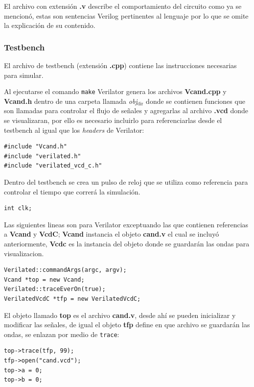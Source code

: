 \documentclass[11pt]{/home/hao/dev/org/latex-plantilla/IEEEtran}
\begin{document}
El archivo con extensión \textbf{.v} describe el comportamiento del
circuito como ya se mencionó, estas son sentencias Verilog
pertinentes al lenguaje por lo que se omite la explicación de su
contenido.

\subsubsection{Testbench}
\label{sec:org051699d}
El archivo de testbench (extensión \textbf{.cpp}) contiene las
instrucciones necesarias para simular.

Al ejecutarse el comando \texttt{make} Verilator genera los archivos
\textbf{Vcand.cpp} y \textbf{Vcand.h} dentro de una carpeta llamada \emph{obj\(_{\text{dir}}\)}
donde se contienen funciones que son llamadas para controlar el
flujo de señales y agregarlas al archivo \textbf{.vcd} donde se
visualizaran, por ello es necesario incluirlo para referenciarlas
desde el testbench al igual que los \emph{headers} de Verilator:

\begin{verbatim}
#include "Vcand.h"
#include "verilated.h"
#include "verilated_vcd_c.h"
\end{verbatim}

Dentro del testbench se crea un pulso de reloj que se utiliza como
referencia para controlar el tiempo que correrá la simulación.

\begin{verbatim}
int clk;
\end{verbatim}

Las siguientes lineas son para Verilator exceptuando las que
contienen referencias a \textbf{Vcand} y \textbf{VcdC}; \textbf{Vcand} instancia el
objeto \textbf{cand.v} el cual se incluyó anteriormente, \textbf{Vcdc} es la
instancia del objeto donde se guardarán las ondas para
visualizacion.

\begin{verbatim}
Verilated::commandArgs(argc, argv);
Vcand *top = new Vcand;
Verilated::traceEverOn(true);
VerilatedVcdC *tfp = new VerilatedVcdC;
\end{verbatim}

El objeto llamado \textbf{top} es el archivo \textbf{cand.v}, desde ahí se
pueden inicializar y modificar las señales, de igual el objeto
\textbf{tfp} define en que archivo se guardarán las ondas, se enlazan por
medio de \texttt{trace}:

\begin{verbatim}
top->trace(tfp, 99);
tfp->open("cand.vcd");
top->a = 0;
top->b = 0;
\end{verbatim}
\end{document}
